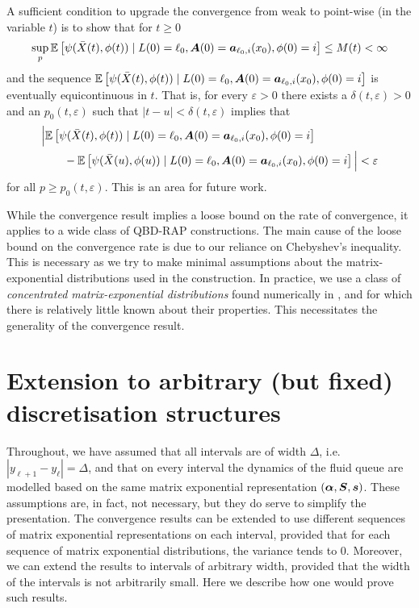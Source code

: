 A sufficient condition to upgrade the convergence from weak to point-wise (in the variable \(t\)) is to show that for \(t\geq 0\) 
\[\sup_{p}\mathbb E\left[\psi(\bar X(t),\phi(t))  \mid L(0)=\ell_0, \boldsymbol A(0)=\boldsymbol  a_{\ell_0,i}(x_0), \phi(0)=i \right]  \leq M(t)<\infty\]
and the sequence \(\mathbb E\left[\psi(\bar X(t),\phi(t))  \mid L(0)=\ell_0, \boldsymbol A(0)=\boldsymbol  a_{\ell_0,i}(x_0), \phi(0)=i \right] \) is eventually equicontinuous in \(t\). That is, for every \(\varepsilon>0\) there exists a \(\delta(t,\varepsilon)>0\) and an \(p_0(t,\varepsilon)\) such that \(|t-u|<\delta(t,\varepsilon)\) implies that 
\begin{align}
	&\nonumber \Big|\mathbb E\left[\psi(\bar X(t),\phi(t))  \mid L(0)=\ell_0, \boldsymbol A(0)=\boldsymbol  a_{\ell_0,i}(x_0), \phi(0)=i \right]
	\\&\qquad{}-\mathbb E\left[\psi(\bar X(u),\phi(u))  \mid L(0)=\ell_0, \boldsymbol A(0)=\boldsymbol  a_{\ell_0,i}(x_0), \phi(0)=i \right]\Big|<\varepsilon
\end{align}
for all \(p\geq p_0(t,\varepsilon)\). This is an area for future work. 

\begin{rem}
	While the convergence result implies a loose bound on the rate of convergence, it applies to a wide class of QBD-RAP constructions. The main cause of the loose bound on the convergence rate is due to our reliance on Chebyshev's inequality. This is necessary as we try to make minimal assumptions about the matrix-exponential distributions used in the construction. In practice, we use a class of \emph{concentrated matrix-exponential distributions} found numerically in \citep{hhat2020}, and for which there is relatively little known about their properties. This necessitates the generality of the convergence result. 
\end{rem}

\section{Extension to arbitrary (but fixed) discretisation structures}
Throughout, we have assumed that all intervals are of width \(\Delta\), i.e.~\(|y_{\ell+1}-y_\ell|=\Delta\), and that on every interval the dynamics of the fluid queue are modelled based on the same matrix exponential representation \((\boldsymbol \alpha, \boldsymbol S, \boldsymbol s)\). These assumptions are, in fact, not necessary, but they do serve to simplify the presentation. The convergence results can be extended to use different sequences of matrix exponential representations on each interval, provided that for each sequence of matrix exponential distributions, the variance tends to \(0\). Moreover, we can extend the results to intervals of arbitrary width, provided that the width of the intervals is not arbitrarily small. Here we describe how one would prove such results.

